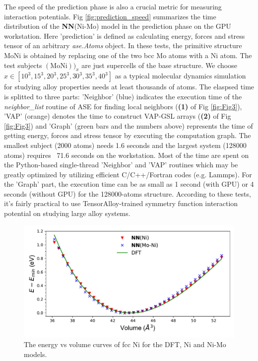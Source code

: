 \documentclass[final,1p,times]{elsarticle}
\begin{document}
The speed of the prediction phase is also a crucial metric for measuring 
interaction potentials. Fig \ref{fig:prediction_speed} summarizes the time 
distribution of the \textbf{NN}(Ni-Mo) model in the prediction phase on the GPU 
workstation. 
Here 'prediction' is defined as calculating energy, forces and stress tensor of 
an arbitrary \textit{ase.Atoms} object. In these tests, the primitive structure
$\mathrm{MoNi}$ is obtained by replacing one of the two bcc Mo atoms with a Ni 
atom. The test subjects $(\mathrm{MoNi}))_{x}$ are just supercells of the base 
structure. We choose $x \in [10^3, 15^3, 20^3, 25^3, 30^3, 35^3, 40^3]$ as
a typical molecular dynamics simulation for studying alloy properties needs at 
least thousands of atoms. The elaspsed time is splitted to three parts: 
'Neighbor' (blue) indicates the execution time of the \textit{neighbor\_list} 
routine of ASE for finding local neighbors (\textbf{(1)} of Fig \ref{fig:Fig3}),
'VAP' (orange) denotes the time to construct VAP-GSL arrays 
(\textbf{(2)} of Fig \ref{fig:Fig3}) and 'Graph' (green bars and the numbers 
above) represents the time of getting energy, forces and stress tensor by 
executing the computation graph. The smallest subject (2000 atoms) needs 1.6 
seconds and the largest system (128000 atoms) requires ~71.6 seconds on the 
workstation. Most of the time are spent on the Python-based single-thread 
'Neighbor' and 'VAP' routines \textemdash which may be greatly optimized by 
utilizing efficient C/C++/Fortran codes (e.g. Lammps). For the 'Graph' part, the 
execution time can be as small as 1 second (with GPU) or 4 seconds (without GPU) 
for the 128000-atoms structure. According to these tests, it's fairly practical 
to use TensorAlloy-trained symmetry function interaction potential on studying 
large alloy systems.

% 
%
\begin{figure}[h!]
    \centering
    \includegraphics[scale=0.65]{figures/Ni_EoS.pdf}
\caption{\label{fig:energy_volume_Ni} The energy vs volume curves of fcc Ni for
the DFT, Ni and Ni-Mo models.}
\end{figure}
\end{document}
